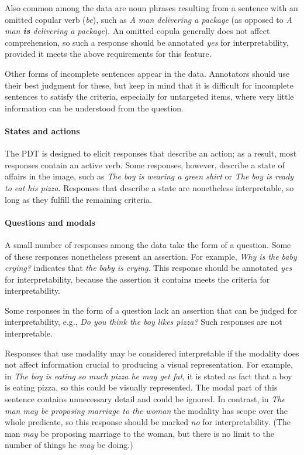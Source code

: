 \documentclass[12pt]{article}
\begin{document}
Also common among the data are noun phrases resulting from a sentence with an omitted copular verb (\textit{be}), such as \textit{A man delivering a package} (as opposed to \textit{A man \textbf{is} delivering a package}). An omitted copula generally does not affect comprehension, so such a response should be annotated \textit{yes} for interpretability, provided it meets the above requirements for this feature.

Other forms of incomplete sentences appear in the data. Annotators should use their best judgment for these, but keep in mind that it is difficult for incomplete sentences to satisfy the criteria, especially for untargeted items, where very little information can be understood from the question.

\paragraph{States and actions} \label{para:interp-question} The PDT is designed to elicit responses that describe an action; as a result, most responses contain an active verb. Some responses, however, describe a state of affairs in the image, such as \textit{The boy is wearing a green shirt} or \textit{The boy is ready to eat his pizza}. Responses that describe a state are nonetheless interpretable, so long as they fulfill the remaining criteria.

\paragraph{Questions and modals} \label{para:interp-question} A small number of responses among the data take the form of a question. Some of these responses nonetheless present an assertion. For example, \textit{Why is the baby crying?} indicates that \textit{the baby is crying}. This response should be annotated \textit{yes} for interpretability, because the assertion it contains meets the criteria for interpretability.

Some responses in the form of a question lack an assertion that can be judged for interpretability, e.g., \textit{Do you think the boy likes pizza?} Such responses are not interpretable.

Responses that use modality may be considered interpretable if the modality does not affect information crucial to producing a visual representation. For example, in \textit{The boy is eating so much pizza he may get fat}, it is stated as fact that a boy is eating pizza, so this could be visually represented. The modal part of this sentence contains unnecessary detail and could be ignored. In contrast, in \textit{The man may be proposing marriage to the woman} the modality has scope over the whole predicate, so this response should be marked \textit{no} for interpretability. (The man \textit{may} be proposing marriage to the woman, but there is no limit to the number of things he \textit{may} be doing.)
\end{document}
